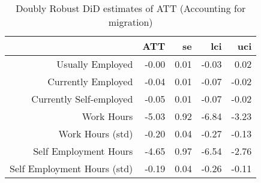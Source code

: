 \begin{table}[ht]
\centering
\begin{tabular}{rrrrr}
  \toprule
 & ATT & se & lci & uci \\ 
  \midrule
Usually Employed & -0.00 & 0.01 & -0.03 & 0.02 \\ 
  Currently Employed & -0.04 & 0.01 & -0.07 & -0.02 \\ 
  Currently Self-employed & -0.05 & 0.01 & -0.07 & -0.02 \\ 
  Work Hours & -5.03 & 0.92 & -6.84 & -3.23 \\ 
  Work Hours (std) & -0.20 & 0.04 & -0.27 & -0.13 \\ 
  Self Employment Hours & -4.65 & 0.97 & -6.54 & -2.76 \\ 
  Self Employment Hours (std) & -0.19 & 0.04 & -0.26 & -0.11 \\ 
   \bottomrule
\end{tabular}
\caption{Doubly Robust DiD estimates of ATT (Accounting for migration)} 
\end{table}
